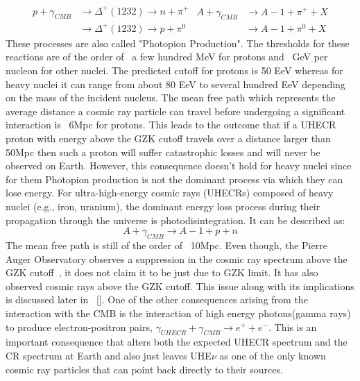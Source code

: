 \begin{equation}\label{eq:GZK}
  \begin{split}
    p + \gamma_{CMB} &\longrightarrow \Delta^+(1232 ) \longrightarrow n+\pi^+ \\ 
                     &\longrightarrow \Delta^+(1232 ) \longrightarrow p+\pi^0
  \end{split} 
  \begin{split}
    A + \gamma_{CMB} &\longrightarrow A-1 + \pi^+ + X \\ 
                     &\longrightarrow A-1 + \pi^0 + X
  \end{split} 
\end{equation}
These processes are also called "Photopion Production". The thresholds for these reactions are of the order of ~a few hundred MeV for protons and ~GeV per nucleon for other nuclei. The predicted cutoff for protons is 50 EeV whereas for heavy nuclei it can range from about 80 EeV to several hundred EeV depending on the mass of the incident nucleus. The mean free path which represents the average distance a cosmic ray particle can travel before undergoing a significant interaction is ~6Mpc for protons. This leads to the outcome that if a UHECR proton with energy above the GZK cutoff travels over a distance larger than 50Mpc then such a proton will suffer catastrophic losses and will never be observed on Earth. However, this consequence doesn't hold for heavy nuclei since for them Photopion production is not the dominant process via which they can lose energy. For ultra-high-energy cosmic rays (UHECRs) composed of heavy nuclei (e.g., iron, uranium), the dominant energy loss process during their propagation through the universe is photodisintegration. It can be described as:
\begin{equation}\label{eq:Pdisinteg}
    A + \gamma_{CMB} \longrightarrow A-1 + p + n  
\end{equation}
The mean free path is still of the order of ~10Mpc.
Even though, the Pierre Auger Observatory observes a suppression in the cosmic ray spectrum above the GZK cutoff~\cite{}, it does not claim it to be just due to GZK limit. It has also observed cosmic rays above the GZK cutoff. This issue along with its implications is discussed later in ~\ref{}. One of the other consequences arising from the interaction with the CMB is the interaction of high energy photons(gamma rays) to produce electron-positron pairs, $\gamma_{UHECR} + \gamma_{CMB} \longrightarrow e^+ + e^- $. This is an important consequence that alters both the expected UHECR spectrum and the CR spectrum at Earth and also just leaves UHE$\nu$ as one of the only known cosmic ray particles that can point back directly to their sources.

